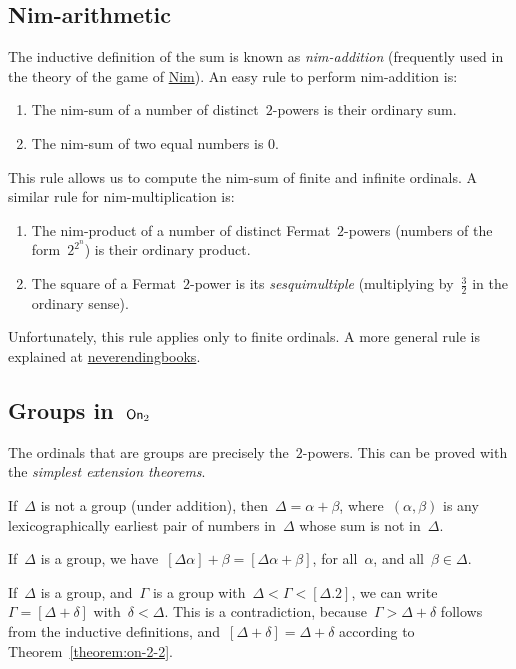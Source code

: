 \subsection{Nim-arithmetic}
The inductive definition of the sum is known as \emph{nim-addition} (frequently used in the theory of the game of \href{http://en.wikipedia.org/wiki/Nim}{Nim}). An easy rule to perform nim-addition is:
\begin{enumerate}
  \item The nim-sum of a number of distinct~$2$-powers is their ordinary sum.
	\item The nim-sum of two equal numbers is 0.
\end{enumerate}
This rule allows us to compute the nim-sum of finite and infinite ordinals. A similar rule for nim-multiplication is:
\begin{enumerate}
  \item The nim-product of a number of distinct Fermat~$2$-powers (numbers of the form~$2^{2^n}$) is their ordinary product.
  \item The square of a Fermat~$2$-power is its \emph{sesquimultiple} (multiplying by~$\frac{3}{2}$ in the ordinary sense).
\end{enumerate}
Unfortunately, this rule applies only to finite ordinals. A more general rule is explained at \href{http://www.neverendingbooks.org/index.php/on2-conways-nim-arithmetics.html}{neverendingbooks}.

\subsection{Groups in~$\operatorname{\mathsf{On}}_2$}
The ordinals that are groups are precisely the~$2$-powers. This can be proved with the \emph{simplest extension theorems}.

\begin{theorem}
  If~$\Delta$ is not a group (under addition), then~$\Delta = \alpha + \beta$, where~$(\alpha, \beta)$ is any lexicographically earliest pair of numbers in~$\Delta$ whose sum is not in~$\Delta$.
  \label{theorem:on-2-1}
\end{theorem}

\begin{theorem}
  If~$\Delta$ is a group, we have~$[\Delta\alpha] + \beta = [\Delta\alpha + \beta]$, for all~$\alpha$, and all~$\beta \in \Delta$.
  \label{theorem:on-2-2}
\end{theorem}

If~$\Delta$ is a group, and~$\Gamma$ is a group with~$\Delta < \Gamma < [\Delta.2]$, we can write~$\Gamma = [\Delta + \delta]$ with~$\delta < \Delta$. This is a contradiction, because~$\Gamma > \Delta + \delta$ follows from the inductive definitions, and~$[\Delta + \delta]  = \Delta + \delta$ according to Theorem~\ref{theorem:on-2-2}.

